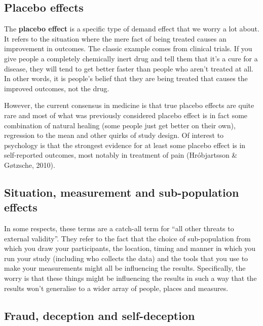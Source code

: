 \documentclass[
  a4paper,
]{book}
\begin{document}
\hypertarget{placebo-effects}{%
\subsection{Placebo effects}\label{placebo-effects}}

The \textbf{placebo effect} is a specific type of demand effect that we
worry a lot about. It refers to the situation where the mere fact of
being treated causes an improvement in outcomes. The classic example
comes from clinical trials. If you give people a completely chemically
inert drug and tell them that it's a cure for a disease, they will tend
to get better faster than people who aren't treated at all. In other
words, it is people's belief that they are being treated that causes the
improved outcomes, not the drug.

However, the current consensus in medicine is that true placebo effects
are quite rare and most of what was previously considered placebo effect
is in fact some combination of natural healing (some people just get
better on their own), regression to the mean and other quirks of study
design. Of interest to psychology is that the strongest evidence for at
least some placebo effect is in self-reported outcomes, most notably in
treatment of pain (Hróbjartsson \& Gøtzsche, 2010).

\hypertarget{situation-measurement-and-sub-population-effects}{%
\subsection{Situation, measurement and sub-population
effects}\label{situation-measurement-and-sub-population-effects}}

In some respects, these terms are a catch-all term for ``all other
threats to external validity''. They refer to the fact that the choice
of sub-population from which you draw your participants, the location,
timing and manner in which you run your study (including who collects
the data) and the tools that you use to make your measurements might all
be influencing the results. Specifically, the worry is that these things
might be influencing the results in such a way that the results won't
generalise to a wider array of people, places and measures.

\hypertarget{fraud-deception-and-self-deception}{%
\subsection{Fraud, deception and
self-deception}\label{fraud-deception-and-self-deception}}
\end{document}
